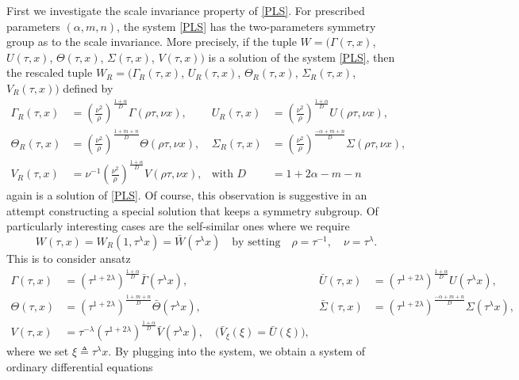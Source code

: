\documentclass[a4paper,11pt]{article}
\def\bG{{\bar{\Gamma}}}
\def\bV{{\bar{V}}}
\def\bTh{{\bar{\Theta}}}
\def\bS{{\bar{\Sigma}}}
\def\bU{{\bar{U}}}
\theoremstyle{remark}
\begin{document}
First we investigate the scale invariance property of \eqref{PLS}. For prescribed parameters $( \alpha, m,n)$, the system \eqref{PLS} has the two-parameters symmetry group as to the scale invariance. More precisely, if the tuple $W=\big( \Gamma(\tau,x)$, $U(\tau,x)$, $\Theta(\tau,x)$, $\Sigma(\tau,x)$, $V(\tau,x)\big)$ is a solution of the system \eqref{PLS}, then the rescaled tuple $W _R=\big( \Gamma _R(\tau,x)$, $U _R(\tau,x)$, $\Theta _R(\tau,x)$, $\Sigma _R(\tau,x)$, $V _R(\tau,x)\big)$ defined by
\begin{align*}
 \Gamma _R(\tau,x) &= \left(\frac{\nu^2}{\rho}\right) ^{ \frac{1+ \alpha}{D}} \Gamma( \rho \tau, \nu x), & U _R(\tau,x) &=\left(\frac{\nu^2}{\rho}\right) ^{ \frac{1+ \alpha}{D}} U( \rho \tau, \nu x),\\
 \Theta _R(\tau,x) &= \left(\frac{\nu^2}{\rho}\right) ^{ \frac{1+ m +n}{D}} \Theta( \rho \tau, \nu x), & \Sigma _R(\tau,x) &= \left(\frac{\nu^2}{\rho}\right) ^{ \frac{- \alpha +m+n}{D}} \Sigma( \rho \tau, \nu x),\\
 V _R(\tau,x) &= \nu ^{-1} \left(\frac{\nu^2}{\rho}\right) ^{ \frac{1+ \alpha}{D}} V( \rho \tau, \nu x), & \text{with } D&=1+ 2\alpha -m-n
\end{align*}
again is a solution of \eqref{PLS}. Of course, this observation is suggestive in an attempt constructing a special solution that keeps a symmetry subgroup. Of particularly interesting cases are the self-similar ones where we require
$$ W(\tau,x) = W _R(1,\tau ^\lambda x)= \bar{W}(\tau ^\lambda x) \quad \text{by setting} \quad \rho = \tau ^{-1}, \quad \nu=\tau^ \lambda.$$
This is to consider ansatz
\begin{align*}
 \Gamma (\tau,x) &= \left(\tau^{1+ 2 \lambda}\right) ^{ \frac{1+ \alpha}{D}} \bG(\tau ^\lambda x), & \bU (\tau,x) &=\left(\tau^{1+ 2 \lambda}\right) ^{ \frac{1+ \alpha}{D}} U( \tau ^\lambda x),\\
 \Theta (\tau,x) &= \left(\tau^{1+ 2 \lambda}\right) ^{ \frac{1+ m +n}{D}} \bTh( \tau ^\lambda x), & \bS (\tau,x) &= \left(\tau^{1+ 2 \lambda}\right) ^{ \frac{- \alpha +m+n}{D}} \Sigma( \tau ^\lambda x),\\
 V (\tau,x) &= \tau ^{-\lambda} \left(\tau^{1+ 2 \lambda}\right) ^{ \frac{1+ \alpha}{D}} \bV( \tau ^\lambda x), \quad \big(\bV _\xi(\xi) = \bU(\xi)\big),
\end{align*}
where we set $\xi\triangleq\tau ^\lambda x$. By plugging into the system, we obtain a system of ordinary differential equations
\end{document}
